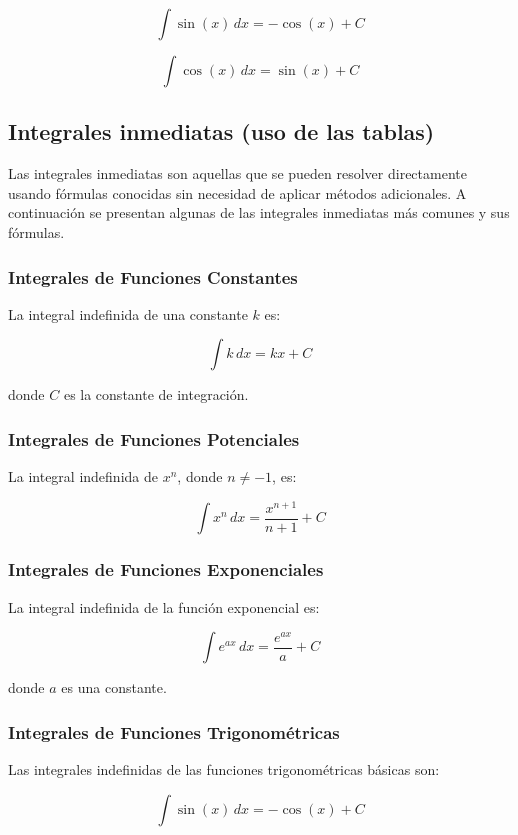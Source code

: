 \[
\int \sin(x) \, dx = -\cos(x) + C
\]

\[
\int \cos(x) \, dx = \sin(x) + C
\]

\newpage
\subsection{Integrales inmediatas (uso de las tablas)}

Las integrales inmediatas son aquellas que se pueden resolver directamente usando fórmulas conocidas sin necesidad de aplicar métodos adicionales. A continuación se presentan algunas de las integrales inmediatas más comunes y sus fórmulas.

\subsubsection{Integrales de Funciones Constantes}

La integral indefinida de una constante \( k \) es:

\[
\int k \, dx = kx + C
\]

donde \( C \) es la constante de integración.

\subsubsection{Integrales de Funciones Potenciales}

La integral indefinida de \( x^n \), donde \( n \neq -1 \), es:

\[
\int x^n \, dx = \frac{x^{n+1}}{n+1} + C
\]

\subsubsection{Integrales de Funciones Exponenciales}

La integral indefinida de la función exponencial es:

\[
\int e^{ax} \, dx = \frac{e^{ax}}{a} + C
\]

donde \( a \) es una constante.

\subsubsection{Integrales de Funciones Trigonométricas}

Las integrales indefinidas de las funciones trigonométricas básicas son:

\[
\int \sin(x) \, dx = -\cos(x) + C
\]

